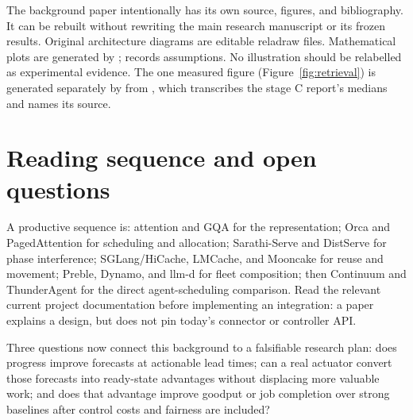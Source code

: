 The background paper intentionally has its own source, figures, and bibliography.
It can be rebuilt without rewriting the main research manuscript or its frozen
results. Original architecture diagrams are editable reladraw files. Mathematical
plots are generated by ;  records
assumptions. No illustration should be relabelled as experimental evidence.
The one measured figure (Figure~\ref{fig:retrieval}) is generated separately by
 from , which transcribes
the stage C report's medians and names its source.

\section{Reading sequence and open questions}
A productive sequence is: attention and GQA for the representation; Orca and
PagedAttention for scheduling and allocation; Sarathi-Serve and DistServe for
phase interference; SGLang/HiCache, LMCache, and Mooncake for reuse and movement;
Preble, Dynamo, and llm-d for fleet composition; then Continuum and ThunderAgent
for the direct agent-scheduling comparison. Read the relevant current project
documentation before implementing an integration: a paper explains a design,
but does not pin today's connector or controller API.

Three questions now connect this background to a falsifiable research plan:
does progress improve forecasts at actionable lead times; can a real actuator
convert those forecasts into ready-state advantages without displacing more
valuable work; and does that advantage improve goodput or job completion over
strong baselines after control costs and fairness are included?

